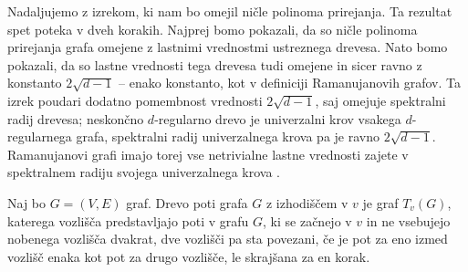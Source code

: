 Nadaljujemo z izrekom, ki nam bo omejil ničle polinoma prirejanja. Ta rezultat spet poteka v dveh korakih. Najprej bomo pokazali, da so ničle polinoma prirejanja grafa omejene z lastnimi vrednostmi ustreznega drevesa. Nato bomo pokazali, da so lastne vrednosti tega drevesa tudi omejene in sicer ravno z konstanto \(2\sqrt{d-1}\) -- enako konstanto, kot v definiciji Ramanujanovih grafov. Ta izrek poudari dodatno pomembnost vrednosti \(2\sqrt{d-1}\), saj omejuje spektralni radij drevesa; neskončno \(d\)-regularno drevo je univerzalni krov vsakega \(d\)-regularnega grafa, spektralni radij univerzalnega krova pa je ravno \(2\sqrt{d-1}\). Ramanujanovi grafi imajo torej vse netrivialne lastne vrednosti zajete v spektralnem radiju svojega univerzalnega krova \cite{hoory}.

\begin{definicija}
    Naj bo \(G=(V, E)\) graf. Drevo poti grafa \(G\) z izhodiščem v \(v\) je graf \(T_v(G)\), katerega vozlišča predstavljajo poti v grafu \(G\), ki se začnejo v \(v\) in ne vsebujejo nobenega vozlišča dvakrat, dve vozlišči pa sta povezani, če je pot za eno izmed vozlišč enaka kot pot za drugo vozlišče, le skrajšana za en korak.
\end{definicija}
